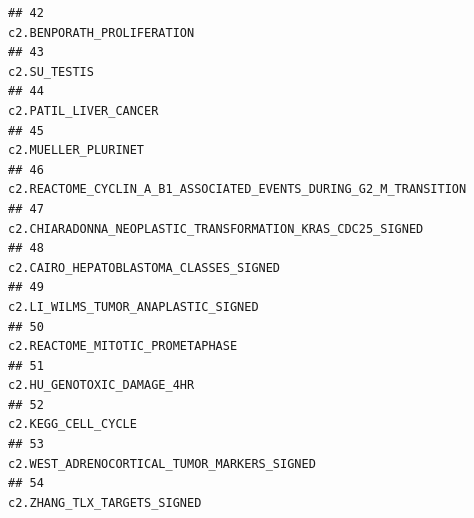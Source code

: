 \documentclass{article}\usepackage[]{graphicx}\usepackage[]{color}
\makeatletter
\newenvironment{kframe}{%
 \def\at@end@of@kframe{}%
 \ifinner\ifhmode%
  \def\at@end@of@kframe{\end{minipage}}%
  \begin{minipage}{\columnwidth}%
 \fi\fi%
 \def\FrameCommand##1{\hskip\@totalleftmargin \hskip-\fboxsep
 \colorbox{shadecolor}{##1}\hskip-\fboxsep
     \hskip-\linewidth \hskip-\@totalleftmargin \hskip\columnwidth}%
 \MakeFramed {\advance\hsize-\width
   \@totalleftmargin\z@ \linewidth\hsize
   \@setminipage}}%
 {\par\unskip\endMakeFramed%
 \at@end@of@kframe}
\newenvironment{knitrout}{}{} %
\makeatother
\begin{document}
\begin{knitrout}
\begin{kframe}
\begin{verbatim}
## 42                                                                                                                                                                                        c2.BENPORATH_PROLIFERATION
## 43                                                                                                                                                                                                      c2.SU_TESTIS
## 44                                                                                                                                                                                             c2.PATIL_LIVER_CANCER
## 45                                                                                                                                                                                               c2.MUELLER_PLURINET
## 46                                                                                                                                                  c2.REACTOME_CYCLIN_A_B1_ASSOCIATED_EVENTS_DURING_G2_M_TRANSITION
## 47                                                                                                                                                        c2.CHIARADONNA_NEOPLASTIC_TRANSFORMATION_KRAS_CDC25_SIGNED
## 48                                                                                                                                                                            c2.CAIRO_HEPATOBLASTOMA_CLASSES_SIGNED
## 49                                                                                                                                                                               c2.LI_WILMS_TUMOR_ANAPLASTIC_SIGNED
## 50                                                                                                                                                                                  c2.REACTOME_MITOTIC_PROMETAPHASE
## 51                                                                                                                                                                                        c2.HU_GENOTOXIC_DAMAGE_4HR
## 52                                                                                                                                                                                                c2.KEGG_CELL_CYCLE
## 53                                                                                                                                                                       c2.WEST_ADRENOCORTICAL_TUMOR_MARKERS_SIGNED
## 54                                                                                                                                                                                       c2.ZHANG_TLX_TARGETS_SIGNED

\end{verbatim}
\end{kframe}
\end{knitrout}
\end{document}
